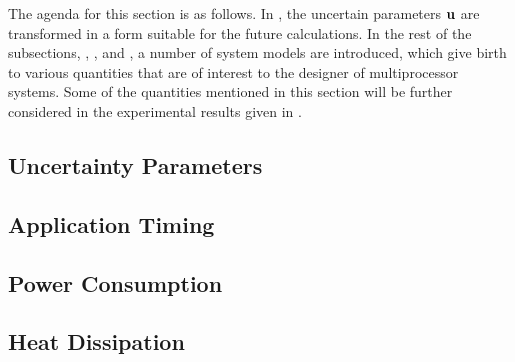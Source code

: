 The agenda for this section is as follows. In , the
uncertain parameters $\mathbf{u}$ are transformed in a form suitable for the future
calculations. In the rest of the subsections, ,
, and , a number of system models
are introduced, which give birth to various quantities that are of interest to
the designer of multiprocessor systems. Some of the quantities mentioned in this
section will be further considered in the experimental results given in
.

\subsection{Uncertainty Parameters} 


\subsection{Application Timing} 


\subsection{Power Consumption} 


\subsection{Heat Dissipation} 


